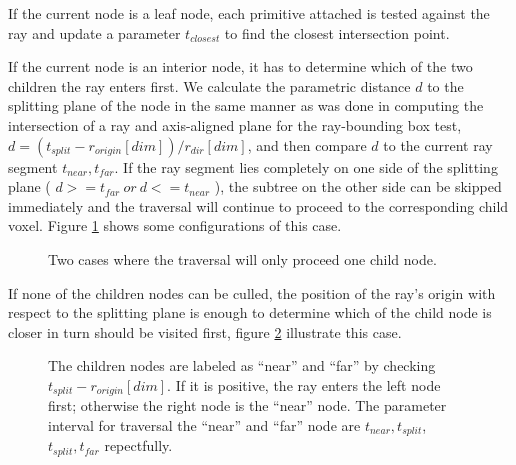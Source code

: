 If the current node is a leaf node, each primitive attached is tested against the ray and update a parameter \( t_{closest} \) to find the closest intersection point. 

If the current node is an interior node, it has to determine which of the two children the ray enters first. We calculate the parametric distance \(d\) to the splitting plane of the node in the same manner as was done in computing the intersection of a ray and axis-aligned plane for the ray-bounding box test, \( d = (t_{split} - r_{origin}[dim]) / r_{dir}[dim] \), and then compare \(d\) to the current ray segment \( t_{near}, t_{far} \). If the ray segment lies completely on one side of the splitting plane ( \( d >= t_{far}\ or\ d <= t_{near}\) ), the subtree on the other side can be skipped immediately and the traversal will continue to proceed to the corresponding child voxel. Figure \ref{fig:kd-tree_traversal_one_child} shows some configurations of this case. 

\begin{figure}[hpt]
	\centering
	\renewcommand{\thefigure}{\thechapter.\arabic{figure}}
	\caption[KD-tree traversal proceed only one child node] {Two cases where the traversal will only proceed one child node. }
	\label{fig:kd-tree_traversal_one_child}	%
\end{figure}
 
If none of the children nodes can be culled, the position of the ray's origin with respect to the splitting plane is enough to determine which of the child node is closer in turn should be visited first, figure \ref{fig:kd-tree_traversal_children} illustrate this case.  

\begin{figure}[H]
	\centering
	\renewcommand{\thefigure}{\thechapter.\arabic{figure}}
	\caption[KD-tree traversal proceed both children nodes] {The children nodes are labeled as ``near'' and ``far'' by checking \( t_{split} - r_{origin}[dim] \). If it is positive, the ray enters the left node first; otherwise the right node is the ``near'' node.  The parameter interval for traversal the ``near'' and ``far'' node are \( t_{near}, t_{split} \), \( t_{split}, t_{far} \) repectfully. }
	\label{fig:kd-tree_traversal_children}	%
\end{figure}

